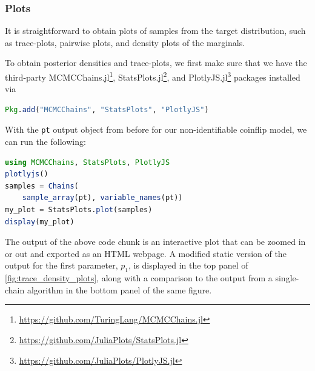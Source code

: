 \subsubsection{Plots}
It is straightforward to obtain plots of samples from the target distribution, 
such as trace-plots, pairwise plots, and density plots of the marginals. 

 
To obtain posterior densities and trace-plots, we first 
make sure that we have the third-party 
MCMCChains.jl\footnote{\url{https://github.com/TuringLang/MCMCChains.jl}}, 
StatsPlots.jl\footnote{\url{https://github.com/JuliaPlots/StatsPlots.jl}}, and 
PlotlyJS.jl\footnote{\url{https://github.com/JuliaPlots/PlotlyJS.jl}} 
packages installed via
\begin{lstlisting}[language=Julia]
Pkg.add("MCMCChains", "StatsPlots", "PlotlyJS")
\end{lstlisting}

With the \texttt{pt} output object from before for our non-identifiable coinflip model, 
we can run the following:
\begin{lstlisting}[language=Julia]
using MCMCChains, StatsPlots, PlotlyJS
plotlyjs()
samples = Chains(
    sample_array(pt), variable_names(pt))
my_plot = StatsPlots.plot(samples)
display(my_plot)
\end{lstlisting}
The output of the above code chunk is an interactive plot that can be zoomed in or out
and exported as an HTML webpage. 
A modified static version of the output for the first parameter, $p_1$, 
is displayed in the top panel of \cref{fig:trace_density_plots},
along with a comparison to the output from a single-chain algorithm in the bottom 
panel of the same figure.

